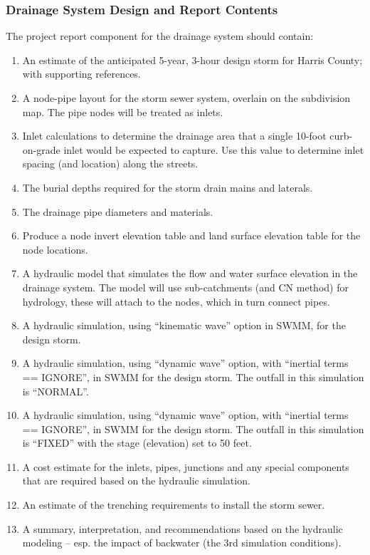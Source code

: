 \documentclass[12pt]{article}
\begin{document}
\subsubsection{\small{Drainage System Design and Report Contents}}
The project report component for the drainage system should contain:
\begin{enumerate}
\item An estimate of the anticipated 5-year, 3-hour design storm for Harris County; with supporting references.
\item A node-pipe layout for the storm sewer system, overlain on the subdivision map.  The pipe nodes will be treated as inlets.
\item Inlet calculations to determine the drainage area that a single 10-foot curb-on-grade inlet would be expected to capture.  Use this value to determine inlet spacing (and location) along the streets. 
\item The burial depths required for the storm drain mains and laterals.
\item The drainage pipe diameters and materials.
\item Produce a node invert elevation table and land surface elevation table for the node locations.
\item A hydraulic model that simulates the flow and water surface elevation in the drainage system.   The model will use sub-catchments (and CN method) for hydrology, these will attach to the nodes, which in turn connect pipes.
\item A hydraulic simulation, using ``kinematic wave'' option in SWMM, for the design storm.
\item A hydraulic simulation, using ``dynamic wave'' option, with ``inertial terms == IGNORE'', in SWMM for the design storm.  The outfall in this simulation is ``NORMAL''.
\item A hydraulic simulation, using ``dynamic wave'' option, with ``inertial terms == IGNORE'', in SWMM for the design storm.  The outfall in this simulation is ``FIXED'' with the stage (elevation) set to 50 feet.
\item A cost estimate for the inlets, pipes, junctions and any special components that are required based on the hydraulic simulation.   
\item An estimate of the trenching requirements to install the storm sewer.
\item A summary, interpretation, and recommendations based on the hydraulic modeling -- esp. the impact of backwater (the 3rd simulation conditions).
\end{enumerate}
\end{document}
